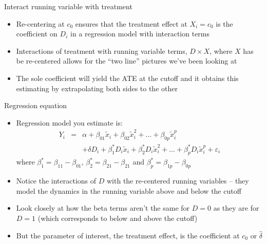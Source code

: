\documentclass{beamer}
\begin{document}
\begin{frame}{Interact running variable with treatment}

\begin{itemize}
		\item Re-centering at $c_0$ ensures that the treatment effect at $X_i=c_0$ is the coefficient on $D_i$ in a regression model with interaction terms
		\item Interactions of treatment with running variable terms, $D \times X$, where $X$ has be re-centered allows for the ``two line'' pictures we've been looking at
		\item The sole coefficient will yield the ATE at the cutoff and it obtains this estimating by extrapolating both sides to the other
\end{itemize}

\end{frame}



\begin{frame}{Regression equation}

\begin{itemize}
	\item Regression model you estimate is:
		\begin{eqnarray*}
		Y_i &=& \alpha + \beta_{01}\tilde{x}_i + \beta_{02}\tilde{x}_i^2 + \dots + \beta_{0p}\tilde{x}_i^p \\
		& & + \delta{D}_i + \beta_1^*D_i\tilde{x}_i + \beta_2^*D_i\tilde{x}_i^2 + \dots + \beta_p^*D_i\tilde{x}_i^p + \varepsilon_i 
		\end{eqnarray*}where $\beta^*_1 = \beta_{11} - \beta_{01}$, $\beta_2^* = \beta_{21} - \beta_{21}$ and $\beta_p^*=\beta_{1p}-\beta_{0p}$
	\item Notice the interactions of $D$ with the re-centered running variables -- they model the dynamics in the running variable above and below the cutoff
	\item Look closely at how the beta terms aren't the same for $D=0$ as they are for $D=1$ (which corresponds to below and above the cutoff)
	\item But the parameter of interest, the treatment effect, is the coefficient at $c_0$ or $\widehat{\delta}$
\end{itemize}

\end{frame}
\end{document}
